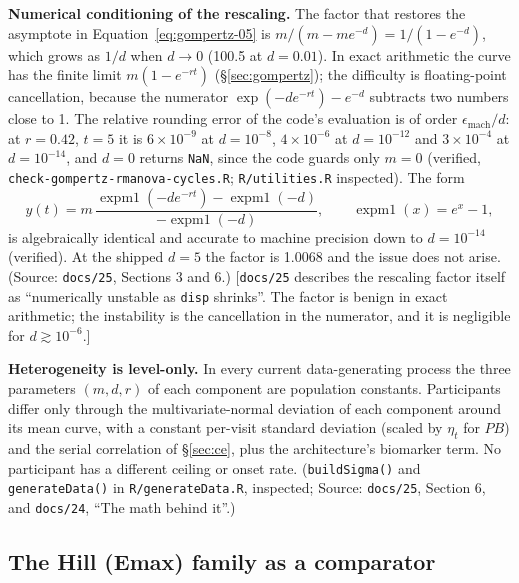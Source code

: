 \documentclass[11pt]{article}
\newcommand{\note}[1]{\textcolor{blue!60!black}{\small [#1]}}
\newcommand{\code}[1]{\texttt{#1}}
\begin{document}
\textbf{Numerical conditioning of the rescaling.} The factor that
restores the asymptote in Equation~\eqref{eq:gompertz-05} is
$m/(m - m e^{-d}) = 1/(1 - e^{-d})$, which grows as $1/d$ when
$d \to 0$ (100.5 at $d = 0.01$). In exact arithmetic the curve has the
finite limit $m(1 - e^{-rt})$ (\S\ref{sec:gompertz}); the difficulty is
floating-point cancellation, because the numerator
$\exp(-d e^{-rt}) - e^{-d}$ subtracts two numbers close to 1. The
relative rounding error of the code's evaluation is of order
$\epsilon_{\mathrm{mach}}/d$: at $r = 0.42$, $t = 5$ it is
$6 \times 10^{-9}$ at $d = 10^{-8}$, $4 \times 10^{-6}$ at $d =
10^{-12}$ and $3 \times 10^{-4}$ at $d = 10^{-14}$, and $d = 0$ returns
\code{NaN}, since the code guards only $m = 0$ (verified,
\code{check-gompertz-rmanova-cycles.R}; \code{R/utilities.R} inspected). The form
\begin{equation}
y(t) = m\,\frac{\operatorname{expm1}(-d e^{-rt}) -
  \operatorname{expm1}(-d)}{-\operatorname{expm1}(-d)},
  \qquad \operatorname{expm1}(x) = e^x - 1,
\label{eq:invb-gompertz-stable}
\end{equation}
is algebraically identical and accurate to machine precision down to
$d = 10^{-14}$ (verified). At the shipped $d = 5$ the factor is 1.0068
and the issue does not arise. (Source: \code{docs/25}, Sections 3
and 6.) \note{\code{docs/25} describes the rescaling factor itself as
``numerically unstable as \code{disp} shrinks''. The factor is benign
in exact arithmetic; the instability is the cancellation in the
numerator, and it is negligible for $d \gtrsim 10^{-6}$.}

\textbf{Heterogeneity is level-only.} In every current
data-generating process the three parameters $(m, d, r)$ of each
component are population constants. Participants differ only through
the multivariate-normal deviation of each component around its mean
curve, with a constant per-visit standard deviation (scaled by
$\eta_t$ for $PB$) and the serial correlation of \S\ref{sec:ce}, plus
the architecture's biomarker term. No participant has a different
ceiling or onset rate. (\code{buildSigma()} and \code{generateData()}
in \code{R/generateData.R}, inspected; Source: \code{docs/25},
Section 6, and \code{docs/24}, ``The math behind it''.)

\subsection{The Hill (Emax) family as a comparator}
\label{sec:invb-hill}
\end{document}
